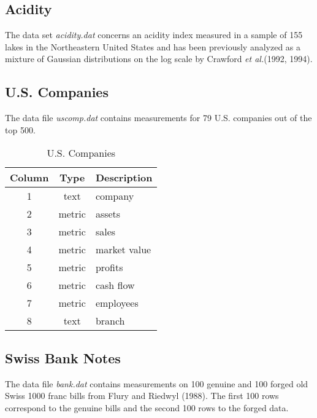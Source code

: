 \subsection*{Acidity}
The data set {\it acidity.dat} concerns an acidity index measured in a
sample of 155 lakes in the Northeastern United States and has been
previously analyzed as a mixture of Gaussian distributions on the log
scale by Crawford {\em et al.}(1992, 1994).

\subsection*{U.S. Companies}
The data file {\it uscomp.dat} contains measurements for 79
U.S. companies out of the top 500.
\begin{table}[h]
    \caption{U.S. Companies}
    \begin{center}
        \begin{tabular}{|c|c|l|}
            \hline
            Column & Type   & Description \\
            \hline
            1 & text   & company \\
            2 & metric & assets \\
            3 & metric & sales \\
            4 & metric & market value \\
            5 & metric & profits \\
            6 & metric & cash flow \\
            7 & metric & employees \\
            8 & text   & branch \\
            \hline
        \end{tabular}
    \end{center}
\end{table}

\subsection*{Swiss Bank Notes}
The data file {\it bank.dat} contains measurements on 100 genuine and
100 forged old Swiss 1000 franc bills from Flury and Riedwyl
(1988). The first 100 rows correspond to the genuine bills and the
second 100 rows to the forged data.

